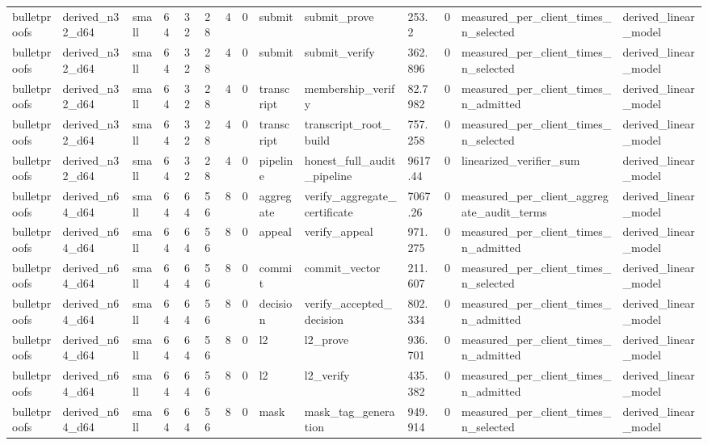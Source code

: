 \begin{table}[t]
\begin{tabular}{llllllllllllll}
bulletproofs & derived\_n32\_d64 & small & 64 & 32 & 28 & 4 & 0 & submit & submit\_prove & 253.2 & 0 & measured\_per\_client\_times\_n\_selected & derived\_linear\_model \\
bulletproofs & derived\_n32\_d64 & small & 64 & 32 & 28 & 4 & 0 & submit & submit\_verify & 362.896 & 0 & measured\_per\_client\_times\_n\_selected & derived\_linear\_model \\
bulletproofs & derived\_n32\_d64 & small & 64 & 32 & 28 & 4 & 0 & transcript & membership\_verify & 82.7982 & 0 & measured\_per\_client\_times\_n\_admitted & derived\_linear\_model \\
bulletproofs & derived\_n32\_d64 & small & 64 & 32 & 28 & 4 & 0 & transcript & transcript\_root\_build & 757.258 & 0 & measured\_per\_client\_times\_n\_selected & derived\_linear\_model \\
bulletproofs & derived\_n32\_d64 & small & 64 & 32 & 28 & 4 & 0 & pipeline & honest\_full\_audit\_pipeline & 9617.44 & 0 & linearized\_verifier\_sum & derived\_linear\_model \\
bulletproofs & derived\_n64\_d64 & small & 64 & 64 & 56 & 8 & 0 & aggregate & verify\_aggregate\_certificate & 7067.26 & 0 & measured\_per\_client\_aggregate\_audit\_terms & derived\_linear\_model \\
bulletproofs & derived\_n64\_d64 & small & 64 & 64 & 56 & 8 & 0 & appeal & verify\_appeal & 971.275 & 0 & measured\_per\_client\_times\_n\_admitted & derived\_linear\_model \\
bulletproofs & derived\_n64\_d64 & small & 64 & 64 & 56 & 8 & 0 & commit & commit\_vector & 211.607 & 0 & measured\_per\_client\_times\_n\_selected & derived\_linear\_model \\
bulletproofs & derived\_n64\_d64 & small & 64 & 64 & 56 & 8 & 0 & decision & verify\_accepted\_decision & 802.334 & 0 & measured\_per\_client\_times\_n\_admitted & derived\_linear\_model \\
bulletproofs & derived\_n64\_d64 & small & 64 & 64 & 56 & 8 & 0 & l2 & l2\_prove & 936.701 & 0 & measured\_per\_client\_times\_n\_admitted & derived\_linear\_model \\
bulletproofs & derived\_n64\_d64 & small & 64 & 64 & 56 & 8 & 0 & l2 & l2\_verify & 435.382 & 0 & measured\_per\_client\_times\_n\_admitted & derived\_linear\_model \\
bulletproofs & derived\_n64\_d64 & small & 64 & 64 & 56 & 8 & 0 & mask & mask\_tag\_generation & 949.914 & 0 & measured\_per\_client\_times\_n\_selected & derived\_linear\_model \\

\end{tabular}
\end{table}
